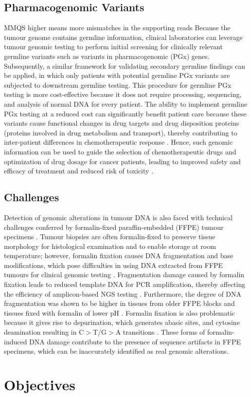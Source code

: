 \subsection{Pharmacogenomic Variants}
MMQS higher means more mismatches in the supporting reads
Because the tumour genome contains germline information, clinical laboratories can leverage tumour genomic testing to perform initial screening for clinically relevant germline variants such as variants in pharmacogenomic (PGx) genes. Subsequently, a similar framework for validating secondary germline findings can be applied, in which only patients with potential germline PGx variants are subjected to downstream germline testing. This procedure for germline PGx testing is more cost-effective because it does not require processing, sequencing, and analysis of normal DNA for every patient. The ability to implement germline PGx testing at a reduced cost can significantly benefit patient care because these variants cause functional changes in drug targets and drug disposition proteins (proteins involved in drug metabolism and transport), thereby contributing to inter-patient differences in chemotherapeutic response \cite{McLeod2013}. Hence, such genomic information can be used to guide the selection of chemotherapeutic drugs and optimization of drug dosage for cancer patients, leading to improved safety and efficacy of treatment and reduced risk of toxicity \cite{McLeod2013}.

\subsection{Challenges}
Detection of genomic alterations in tumour DNA is also faced with technical challenges conferred by formalin-fixed paraffin-embedded (FFPE) tumour specimens \cite{Do2015,Wong2014}. Tumour biopsies are often formalin-fixed to preserve tissue morphology for histological examination and to enable storage at room temperature; however, formalin fixation causes DNA fragmentation and base modifications, which pose difficulties in using DNA extracted from FFPE tumours for clinical genomic testing \cite{Do2015,Wong2014}. Fragmentation damage caused by formalin fixation leads to reduced template DNA for PCR amplification, thereby affecting the efficiency of amplicon-based NGS testing \cite{Do2015,Wong2014}. Furthermore, the degree of DNA fragmentation was shown to be higher in tissues from older FFPE blocks and tissues fixed with formalin of lower pH \cite{Do2015}. Formalin fixation is also problematic because it gives rise to depurination, which generates abasic sites, and cytosine deamination resulting in C$>$T/G$>$A transitions \cite{Do2015}. These forms of formalin-induced DNA damage contribute to the presence of sequence artifacts in FFPE specimens, which can be inaccurately identified as real genomic alterations.


\section{Objectives}
\label{sec:Objectives}
